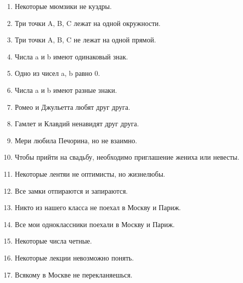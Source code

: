 \documentclass[14pt]{extreport}
\begin{document}
\begin{enumerate}
\item Некоторые мюмзики не куздры.
\item Три точки A, B, C лежат на одной окружности.
\item Три точки A, B, C не лежат на одной прямой.
\item Числа a и b имеют одинаковый знак.
\item Одно из чисел a, b равно 0.
\item Числа a и b имеют разные знаки.
\item Ромео и Джульетта любят друг друга.
\item Гамлет и Клавдий ненавидят друг друга.
\item Мери любила Печорина, но не взаимно.
\item Чтобы прийти на свадьбу, необходимо приглашение жениха или невесты.
\item Некоторые лентяи не оптимисты, но жизнелюбы.
\item Все замки отпираются и запираются.
\item Никто из нашего класса не поехал в Москву и Париж.
\item Все мои одноклассники поехали в Москву и Париж.
\item Некоторые числа четные.
\item Некоторые лекции невозможно понять.
\item Всякому в Москве не перекланяешься.
\end{enumerate}
\end{document}
